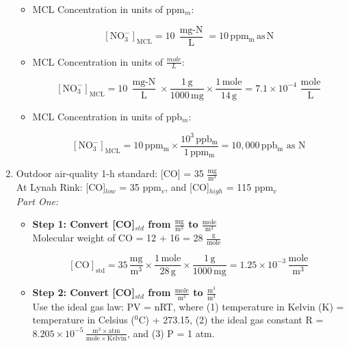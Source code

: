\documentclass[12pt,letterpaper]{article}
\newcommand{\var}[1]{{\operatorname{#1}}}
\begin{document}
\begin{enumerate}
\begin{itemize}
\item MCL Concentration in units of ppm$_m$:

\begin{equation*}
\mathrm{[NO_3^-]_{MCL} = 10\, \frac{\var{mg-N}}{L} = 10 \, ppm_m\, as\, N}
\end{equation*}

\item MCL Concentration in units of $\frac{mole}{L}$:

\begin{equation*}
\mathrm{[NO_3^-]_{MCL} = 10\, \frac{\var{mg-N}}{L}\times \frac{1\,g}{1000\,mg}\times \frac{1\,mole}{14\,g} = 7.1\times 10^{-4}\,\,\frac{mole}{L}}
\end{equation*}

\item MCL Concentration in units of ppb$_m$:

\begin{equation*}
\mathrm{[NO_3^-]_{MCL} = 10\, ppm_m\times \frac{10^3\, ppb_m}{1\, ppm_m} = 10,000\,ppb_m\,\, as\,\, N}
\end{equation*}
\end{itemize}

\item 
Outdoor air-quality 1-h standard: [CO] = 35 $\mathrm{\frac{mg}{m^3}}$\\
At Lynah Rink: [CO]$_{low}$ = 35 ppm$_v$, and [CO]$_{high}$ = 115 ppm$_v$\\


\emph{Part One:}

\begin{itemize}
\item
\textbf{Step 1: Convert [CO]$_{std}$ from $\mathrm{\frac{mg}{m^3}}$ to $\mathrm{\frac{mole}{m^3}}$}\\

Molecular weight of CO = 12 + 16 = 28 $\mathrm{\frac{g}{mole}}$

\begin{equation*}
\mathrm{[CO]_{std} = 35\,\frac{mg}{m^3}\times \frac{1\,mole}{28\,g}\times \frac{1\,g}{1000\,mg} = 1.25\times 10^{-3}\, \frac{mole}{m^3}}
\end{equation*}

\item
\textbf{Step 2: Convert [CO]$_{std}$ from $\mathrm{\frac{mole}{m^3}}$ to $\mathrm{\frac{m^3}{m^3}}$} \\

Use the ideal gas law: PV = nRT, where (1) temperature in Kelvin (K) = temperature in Celsius ($^0$C) + 273.15, (2) the ideal gas constant R = $8.205\times 10^{-5}\, \mathrm{\frac{m^3 \times atm}{mole \times Kelvin}}$, and (3) P = 1 atm. 


\end{itemize}
\end{enumerate}
\end{document}

